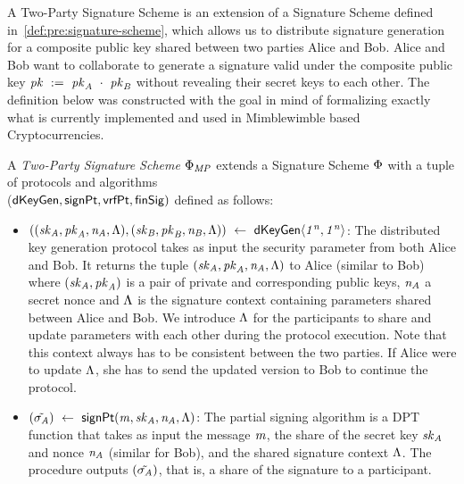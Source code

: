 A Two-Party Signature Scheme is an extension of a Signature Scheme defined in~\cref{def:pre:signature-scheme}, which allows us to distribute signature generation for a composite public key shared between two parties Alice and Bob.
Alice and Bob want to collaborate to generate a signature valid under the composite public key $\mathit{pk} ~:=~ \mathit{pk}_{\mathit{A}} ~\cdot~ \mathit{pk}_{\mathit{B}}$ without revealing their secret keys to each other.
The definition below was constructed with the goal in mind of formalizing exactly what is currently implemented and used in Mimblewimble based Cryptocurrencies.

\begin{definition}
    \label{def:sig:two-party-sig}

    A \emph{Two-Party Signature Scheme $\Phi_{\mathit{MP}}$} extends a Signature Scheme $\Phi$ with a tuple of protocols and algorithms\\
    ($\mathsf{dKeyGen}, \mathsf{signPt} , \mathsf{vrfPt}, \mathsf{finSig})$ defined as follows:

    \begin{itemize}
        \item $((\mathit{sk}_{\mathit{A}}, \mathit{pk}_{\mathit{A}}, \mathit{\mathit{n}_{\mathit{A}}}, \Lambda), (\mathit{sk}_{\mathit{B}}, \mathit{pk}_{\mathit{B}}, \mathit{\mathit{n}_{\mathit{B}}}, \Lambda)) ~\leftarrow~ \mathsf{dKeyGen}\langle \mathit{1^n}, \mathit{1^n} \rangle$: The distributed key generation protocol takes as input the security parameter from both Alice and Bob.
        It returns the tuple $(\mathit{sk}_{\mathit{A}}, \mathit{pk}_{\mathit{A}}, \mathit{\mathit{n}_{\mathit{A}}}, \Lambda)$ to Alice (similar to Bob) where $(\mathit{sk}_{\mathit{A}}, \mathit{pk}_{\mathit{A}})$ is a pair of private and corresponding public keys, $\mathit{\mathit{n}_{\mathit{A}}}$ a secret nonce and $\Lambda$ is the signature context containing parameters shared between Alice and Bob.
        We introduce $\Lambda$ for the participants to share and update parameters with each other during the protocol execution.
        Note that this context always has to be consistent between the two parties.
        If Alice were to update $\Lambda$, she has to send the updated version to Bob to continue the protocol.

        \item $(\tilde{\sigma_{\mathit{A}}}) ~\leftarrow~ \mathsf{signPt}(\mathit{m}, \mathit{sk}_{\mathit{A}}, \mathit{\mathit{n}_{\mathit{A}}}, \Lambda)$: The partial signing algorithm is a DPT function that takes as input the message $\mathit{m}$, the share of the secret key $\mathit{sk}_{\mathit{A}}$ and nonce $\mathit{\mathit{n}_{\mathit{A}}}$ (similar for Bob), and the shared signature context $\Lambda$. The procedure outputs $(\tilde{\sigma_{\mathit{A}}})$, that is, a share of the signature to a participant.


\end{itemize}
\end{definition}
